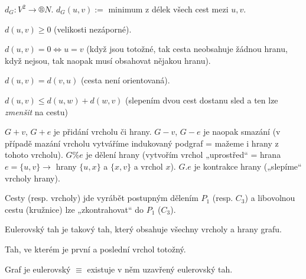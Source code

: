 \documentclass[12pt]{article}					%
\begin{document}
    \begin{definice}
        $d_G: V^2 \rightarrow ®N$. $d_G (u, v) :=$ minimum z délek všech cest mezi $u, v$.

        \begin{dukazin}[Metrika]
            $d(u, v) ≥ 0$ (velikosti nezáporné).

            $d(u, v) = 0 \Leftrightarrow u = v$ (když jsou totožné, tak cesta neobsahuje žádnou hranu, když nejsou, tak naopak musí obsahovat nějakou hranu).

            $d(u, v) = d(v, u)$ (cesta není orientovaná).

            $d(u, v) ≤ d(u, w) + d(w, v)$ (slepením dvou cest dostanu sled a ten lze \emph{zmenšit} na cestu)
        \end{dukazin}
    \end{definice}

    \begin{definice}
        $G+v$, $G+e$ je přidání vrcholu či hrany. $G - v$, $G-e$ je naopak smazání (v případě mazání vrcholu vytváříme indukovaný podgraf = mažeme i hrany z tohoto vrcholu). $G\% e$ je dělení hrany (vytvořím vrchol „uprostřed“ = hrana $e = \{u, v\} \rightarrow$ hrany $\{u, x\}$ a $\{x, v\}$ a vrchol $x$). $G.e$ je kontrakce hrany („slepíme“ vrcholy hrany).
    \end{definice}

    \begin{poznamka}[Pozorování]
        Cesty (resp. vrcholy) jde vyrábět postupným dělením $P_1$ (resp. $C_3$) a libovolnou cestu (kružnice) lze „zkontrahovat“ do $P_1$ ($C_3$).
    \end{poznamka}


    \begin{definice}
        Eulerovský tah je takový tah, který obsahuje všechny vrcholy a hrany grafu.
    \end{definice}

    \begin{definice}
        Tah, ve kterém je první a poslední vrchol totožný.
    \end{definice}

    \begin{definice}
        Graf je eulerovský $≡$ existuje v něm uzavřený eulerovský tah.
    \end{definice}
\end{document}
